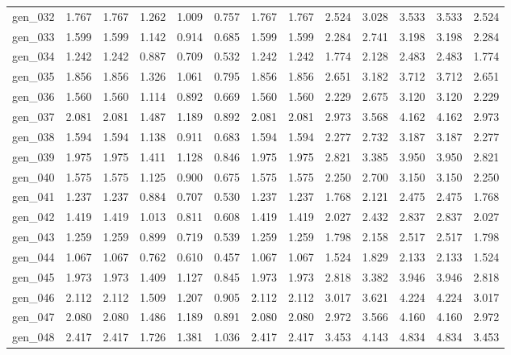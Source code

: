 \begin{tabular}{lrrrrrrrrrrrr}
gen\_032 &  1.767 &  1.767 &  1.262 &  1.009 &  0.757 &  1.767 &  1.767 &  2.524 &  3.028 &  3.533 &  3.533 &  2.524 \\
gen\_033 &  1.599 &  1.599 &  1.142 &  0.914 &  0.685 &  1.599 &  1.599 &  2.284 &  2.741 &  3.198 &  3.198 &  2.284 \\
gen\_034 &  1.242 &  1.242 &  0.887 &  0.709 &  0.532 &  1.242 &  1.242 &  1.774 &  2.128 &  2.483 &  2.483 &  1.774 \\
gen\_035 &  1.856 &  1.856 &  1.326 &  1.061 &  0.795 &  1.856 &  1.856 &  2.651 &  3.182 &  3.712 &  3.712 &  2.651 \\
gen\_036 &  1.560 &  1.560 &  1.114 &  0.892 &  0.669 &  1.560 &  1.560 &  2.229 &  2.675 &  3.120 &  3.120 &  2.229 \\
gen\_037 &  2.081 &  2.081 &  1.487 &  1.189 &  0.892 &  2.081 &  2.081 &  2.973 &  3.568 &  4.162 &  4.162 &  2.973 \\
gen\_038 &  1.594 &  1.594 &  1.138 &  0.911 &  0.683 &  1.594 &  1.594 &  2.277 &  2.732 &  3.187 &  3.187 &  2.277 \\
gen\_039 &  1.975 &  1.975 &  1.411 &  1.128 &  0.846 &  1.975 &  1.975 &  2.821 &  3.385 &  3.950 &  3.950 &  2.821 \\
gen\_040 &  1.575 &  1.575 &  1.125 &  0.900 &  0.675 &  1.575 &  1.575 &  2.250 &  2.700 &  3.150 &  3.150 &  2.250 \\
gen\_041 &  1.237 &  1.237 &  0.884 &  0.707 &  0.530 &  1.237 &  1.237 &  1.768 &  2.121 &  2.475 &  2.475 &  1.768 \\
gen\_042 &  1.419 &  1.419 &  1.013 &  0.811 &  0.608 &  1.419 &  1.419 &  2.027 &  2.432 &  2.837 &  2.837 &  2.027 \\
gen\_043 &  1.259 &  1.259 &  0.899 &  0.719 &  0.539 &  1.259 &  1.259 &  1.798 &  2.158 &  2.517 &  2.517 &  1.798 \\
gen\_044 &  1.067 &  1.067 &  0.762 &  0.610 &  0.457 &  1.067 &  1.067 &  1.524 &  1.829 &  2.133 &  2.133 &  1.524 \\
gen\_045 &  1.973 &  1.973 &  1.409 &  1.127 &  0.845 &  1.973 &  1.973 &  2.818 &  3.382 &  3.946 &  3.946 &  2.818 \\
gen\_046 &  2.112 &  2.112 &  1.509 &  1.207 &  0.905 &  2.112 &  2.112 &  3.017 &  3.621 &  4.224 &  4.224 &  3.017 \\
gen\_047 &  2.080 &  2.080 &  1.486 &  1.189 &  0.891 &  2.080 &  2.080 &  2.972 &  3.566 &  4.160 &  4.160 &  2.972 \\
gen\_048 &  2.417 &  2.417 &  1.726 &  1.381 &  1.036 &  2.417 &  2.417 &  3.453 &  4.143 &  4.834 &  4.834 &  3.453 \\

\end{tabular}
